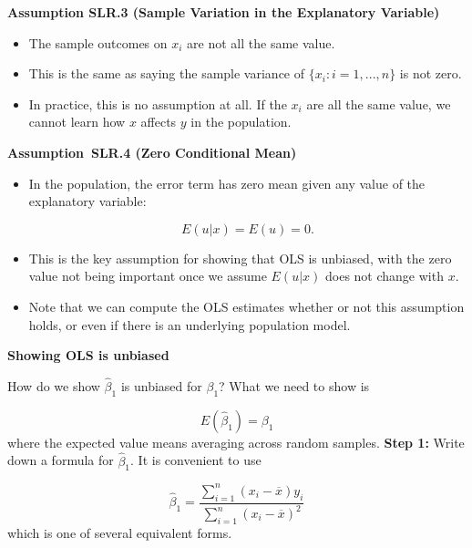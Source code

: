 \documentclass[notes=show]{beamer}
\begin{document}
\begin{frame}[plain]

 \textbf{Assumption SLR.3 (Sample Variation in the Explanatory Variable)}

 \begin{itemize}
  \item The sample outcomes on $x_{i}$ are not all the same value.

  \item This is the same as saying the sample variance of $\{x_{i}:i=1,...,n\}$ is not zero.

  \item In practice, this is no assumption at all. If the $x_{i}$ are all the same value, we cannot learn how $x$ affects $y$ in the population.
 \end{itemize}
\end{frame}

\begin{frame}[plain]

\textbf{Assumption\ SLR.4 (Zero Conditional Mean)}
 \begin{itemize}
  \item In the population, the error term has zero mean given any value of the explanatory variable:

   \begin{equation}
    E(u|x)=E(u)=0.
   \end{equation}

  \item This is the key assumption for showing that OLS is unbiased, with the zero value not being important once we assume $E(u|x)$ does not change with $x$.

  \item Note that we can compute the OLS estimates whether or not this assumption holds, or even if there is an underlying population model.
 \end{itemize}
\end{frame}


\begin{frame}[plain]
\begin{center}
\textbf{Showing OLS is unbiased}
\end{center}

How do we show $\hat{\beta}_{1}$ is unbiased for $\beta_{1}$? What we need to show is

 \begin{equation}
  E(\hat{\beta}_{1})=\beta _{1}
 \end{equation}
 where the expected value means averaging across random samples.
 \linebreak
 \textbf{Step 1:} Write down a formula for $\hat{\beta}_{1}$. It is convenient to use

 \begin{equation}
  \hat{\beta}_{1}=\frac{\sum_{i=1}^{n}(x_{i}-\overline{x})y_{i}}{\sum_{i=1}^{n}(x_{i}-\overline{x})^{2}}
 \end{equation}
 which is one of several equivalent forms.

\end{frame}
\end{document}
